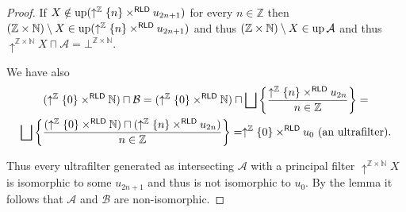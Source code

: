 \begin{proof}
If $X\notin\operatorname{up}(\uparrow^{\mathbb{Z}}\{n\}\times^{\mathsf{RLD}}u_{2n+1})$
for every $n\in\mathbb{Z}$ then $(\mathbb{Z}\times\mathbb{N})\setminus X\in\operatorname{up}(\uparrow^{\mathbb{Z}}\{n\}\times^{\mathsf{RLD}}u_{2n+1})$
and thus $(\mathbb{Z}\times\mathbb{N})\setminus X\in\operatorname{up}\mathcal{A}$
and thus $\uparrow^{\mathbb{Z}\times\mathbb{N}}X\sqcap\mathcal{A}=\bot^{\mathbb{Z}\times\mathbb{N}}$.

We have also
\begin{multline*}
(\uparrow^{\mathbb{Z}}\{0\}\times^{\mathsf{RLD}}\mathbb{N})\sqcap\mathcal{B}=(\uparrow^{\mathbb{Z}}\{0\}\times^{\mathsf{RLD}}\mathbb{N})\sqcap\bigsqcup\setcond{\uparrow^{\mathbb{Z}}\{n\}\times^{\mathsf{RLD}} u_{2n}}{n\in\mathbb{Z}}=\\
\bigsqcup\setcond{(\uparrow^{\mathbb{Z}}\{0\}\times^{\mathsf{RLD}}\mathbb{N})\sqcap(\uparrow^{\mathbb{Z}}\{n\}\times^{\mathsf{RLD}} u_{2n})}{n\in\mathbb{Z}}=\uparrow^{\mathbb{Z}}\{0\}\times^{\mathsf{RLD}}u_{0}\text{ (an ultrafilter).}
\end{multline*}


Thus every ultrafilter generated as intersecting $\mathcal{A}$ with
a principal filter $\uparrow^{\mathbb{Z}\times\mathbb{N}}X$ is isomorphic
to some $u_{2n+1}$ and thus is not isomorphic to $u_{0}$. By the
lemma it follows that $\mathcal{A}$ and $\mathcal{B}$ are non-isomorphic.
\end{proof}

